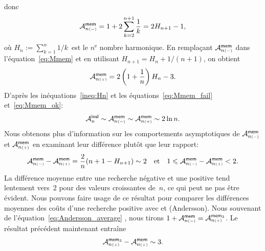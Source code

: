 donc
\begin{equation}
\M{\fun{mem}}{n{\scriptscriptstyle (-)}} =
1 + 2 \sum_{k=2}^{n+1}\frac{1}{k} = 2H_{n+1} - 1,
\index{mem@$\M{\fun{mem}}{n{\scriptscriptstyle (-)}}$}
\label{eq:Mmem_fail}
\end{equation}
où \(H_n := \sum_{k=1}^{n}1/k\)~est le \(n^\text{e}\) nombre
harmonique. En remplaçant
\(\M{\fun{mem}}{n{\scriptscriptstyle (-)}}\) dans
l'équation~\eqref{eq:Mmem} et en utilisant \(H_{n+1} = H_n +
1/(n+1)\), on obtient
\begin{equation}
\M{\fun{mem}}{n{\scriptscriptstyle (+)}} =
2\left(1+\frac{1}{n}\right)H_n - 3.
\index{mem@$\M{\fun{mem}}{n{\scriptscriptstyle (+)}}$}
\label{eq:Mmem_ok}
\end{equation}
D'après les inéquations~\eqref{ineq:Hn}  et
les équations~\eqref{eq:Mmem_fail} et~\eqref{eq:Mmem_ok}:
\begin{equation*}
\M{\fun{insl}}{n}
\sim \M{\fun{mem}}{n{\scriptscriptstyle (-)}}
\sim \M{\fun{mem}}{n{\scriptscriptstyle (+)}} \sim 2 \ln n.
\end{equation*}
Nous obtenons plus d'information sur les comportements asymptotiques
de \(\M{\fun{mem}}{n{\scriptscriptstyle(-)}}\) et
\(\M{\fun{mem}}{n{\scriptscriptstyle(+)}}\) en examinant leur
différence plutôt que leur rapport:
\begin{equation*}
\M{\fun{mem}}{n{\scriptscriptstyle (-)}} -
\M{\fun{mem}}{n{\scriptscriptstyle (+)}} =
\frac{2}{n}(n + 1 - H_{n+1}) \sim 2
\quad\text{et}\quad
1 \leqslant \M{\fun{mem}}{n{\scriptscriptstyle (-)}} -
\M{\fun{mem}}{n{\scriptscriptstyle (+)}} < 2.
\end{equation*}
La différence moyenne entre une recherche négative et une positive
tend lentement vers~\(2\) pour des valeurs croissantes de~\(n\), ce
qui peut ne pas être évident. Nous pouvons faire usage de ce résultat
pour comparer les différences moyennes des coûts d'une recherche
positive avec  et  (Andersson). Nous
souvenant de l'équation~\eqref{eq:Andersson_average}
, nous tirons \(1 +
\M{\fun{mem}}{n{\scriptscriptstyle (-)}} =
\M{\fun{mem}_3}{n{\scriptscriptstyle (+)}}\). Le résultat précédent
maintenant entraîne
\begin{equation*}
  \M{\fun{mem}_3}{n{\scriptscriptstyle (+)}} -
  \M{\fun{mem}}{n{\scriptscriptstyle (+)}} \sim 3.
\index{mem3@$\M{\fun{mem}_3}{n{\scriptscriptstyle (+)}}$}
\end{equation*}
